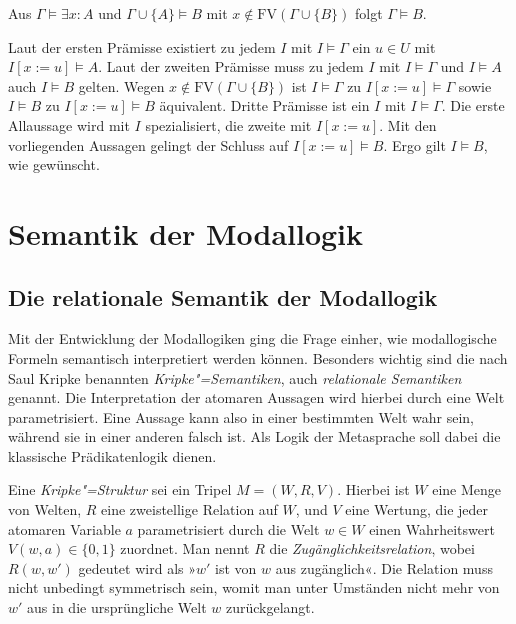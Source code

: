 \begin{Satz}
Aus $\Gamma\models\exists x\colon A$ und $\Gamma\cup\{A\}\models B$
mit $x\notin\mathrm{FV}(\Gamma\cup\{B\})$ folgt $\Gamma\models B$.
\end{Satz}
\begin{Beweis}
Laut der ersten Prämisse existiert zu jedem $I$ mit $I\models\Gamma$
ein $u\in U$ mit $I[x:=u]\models A$. Laut der zweiten Prämisse muss
zu jedem $I$ mit $I\models\Gamma$ und $I\models A$ auch $I\models B$
gelten. Wegen $x\notin\mathrm{FV}(\Gamma\cup\{B\})$ ist $I\models\Gamma$
zu $I[x:=u]\models\Gamma$ sowie $I\models B$ zu $I[x:=u]\models B$
äquivalent. Dritte Prämisse ist ein $I$ mit $I\models\Gamma$. Die erste
Allaussage wird mit $I$ spezialisiert, die zweite mit $I[x:=u]$. 
Mit den vorliegenden Aussagen gelingt der Schluss auf $I[x:=u]\models B$.
Ergo gilt $I\models B$, wie gewünscht.\,\qedsymbol
\end{Beweis}

\section{Semantik der Modallogik}

\subsection{Die relationale Semantik der Modallogik}

Mit der Entwicklung der Modallogiken ging die Frage einher, wie
modallogische Formeln semantisch interpretiert werden können.
Besonders wichtig sind die nach Saul Kripke benannten
\emph{Kripke"=Semantiken}, auch \emph{relationale Semantiken} genannt.
Die Interpretation der atomaren Aussagen wird hierbei durch eine Welt
parametrisiert. Eine Aussage kann also in einer bestimmten Welt wahr
sein, während sie in einer anderen falsch ist. Als Logik der Metasprache
soll dabei die klassische Prädikatenlogik dienen.

Eine \emph{Kripke"=Struktur} sei ein Tripel $M=(W,R,V)$. Hierbei
ist $W$ eine Menge von Welten, $R$ eine zweistellige Relation auf
$W$, und $V$ eine Wertung, die jeder atomaren Variable $a$
parametrisiert durch die Welt $w\in W$ einen Wahrheitswert
$V(w,a)\in\{0,1\}$ zuordnet. Man nennt $R$ die
\emph{Zugänglichkeitsrelation}, wobei $R(w,w')$ gedeutet wird als
»$w'$ ist von $w$ aus zugänglich«. Die Relation muss nicht unbedingt
symmetrisch sein, womit man unter Umständen nicht mehr von
$w'$ aus in die ursprüngliche Welt $w$ zurückgelangt.

